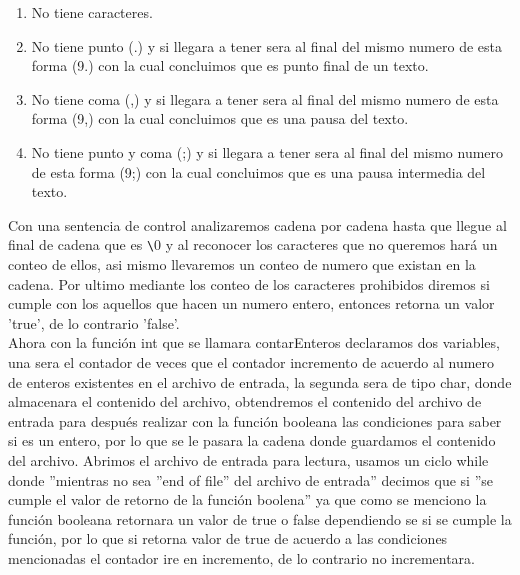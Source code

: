 \documentclass[12pt,letterpaper]{report}
\begin{document}
\begin{enumerate}
\item No tiene caracteres.
\item No tiene punto (.) y si llegara a tener sera al final del mismo numero de esta forma (9.) con la cual concluimos que es punto final de un texto.
\item No tiene coma (,)  y si llegara a tener sera al final del mismo numero de esta forma (9,) con la cual concluimos que es una pausa del texto.
\item No tiene punto y coma (;)  y si llegara a tener sera al final del mismo numero de esta forma (9;) con la cual concluimos que es una pausa intermedia del texto.

\end{enumerate}
Con una sentencia de control analizaremos cadena por cadena hasta que llegue al final de cadena que es  \verb'\'0 y al reconocer los caracteres que no queremos hará un conteo de ellos, asi mismo llevaremos un conteo de numero que existan en la cadena. Por ultimo mediante los conteo de los caracteres prohibidos diremos si cumple con los aquellos que hacen un numero entero, entonces retorna un valor 'true', de lo contrario 'false'.\\
Ahora con la función int que se llamara contarEnteros declaramos dos variables, una sera el contador de veces que el contador incremento de acuerdo al numero de enteros existentes en el archivo de entrada, la segunda sera de tipo char, donde almacenara el contenido del archivo, obtendremos el contenido del archivo de entrada para después realizar con la función booleana las condiciones para saber si es un entero, por lo que se le pasara la cadena donde guardamos el contenido del archivo.
Abrimos el archivo de entrada para lectura, usamos un ciclo while donde ''mientras no sea ''end of file'' del archivo de entrada'' decimos que si ''se cumple el valor de retorno de la función boolena'' ya que como se menciono la función booleana retornara un valor de true o false dependiendo se si se cumple la función, por lo que si retorna valor de true de acuerdo a las condiciones mencionadas el contador ire en incremento, de lo contrario no incrementara.\\\\
\end{document}
